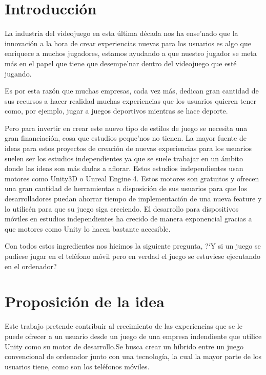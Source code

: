 \section{Introducci\'on}
\label{cap1:sec:introduccion}

La industria del videojuego en esta \'ultima d\'ecada nos ha ense'nado que la innovaci\'on
 a la hora de crear experiencias nuevas para los usuarios es algo que enriquece a muchos jugadores, estamos ayudando a que
 nuestro jugador se meta m\'as en el papel que tiene que desempe'nar dentro del
 videojuego que est\'e jugando.

Es por esta raz\'on que muchas empresas, cada vez m\'as, dedican gran cantidad de sus recursos
a hacer realidad muchas experiencias que los usuarios quieren tener como, por ejemplo,
 jugar a juegos deportivos mientras se hace deporte.

Pero para invertir en crear este nuevo tipo de estilos de juego se necesita una gran financiaci\'on,
 cosa que estudios peque'nos no tienen. La mayor fuente de ideas para estos proyectos de creaci\'on
 de nuevas experiencias para los usuarios suelen ser los estudios independientes ya que se suele trabajar en un
 \'ambito donde las ideas son m\'as dadas a aflorar. Estos estudios independientes usan motores como Unity3D o Unreal Engine 4.
 Estos motores son gratuitos y ofrecen una gran cantidad de herramientas a disposici\'on de sus usuarios para
 que los desarrolladores puedan ahorrar tiempo de implementaci\'on de una nueva feature y lo utilic\'en para que su juego siga creciendo.
El desarrollo para dispositivos m\'oviles en estudios independientes ha crecido de manera exponencial gracias a que motores como Unity lo hacen bastante accesible. 


Con todos estos ingredientes nos hicimos la siguiente pregunta,
 ?`Y si un juego se pudiese jugar en el tel\'efono m\'ovil pero en verdad el juego se estuviese ejecutando en el ordenador?


\section{Proposici\'on de la idea}
\label{cap1:sec:porp-idea}

Este trabajo pretende contribuir al crecimiento de las experiencias que se le puede ofrecer a un usuario desde un juego de una empresa indendiente que utilice Unity como su motor de desarrollo.Se busca crear un h\'ibrido entre un juego convencional de ordenador junto con una tecnolog\'ia, la cual la mayor parte de los usuarios tiene, como son los tel\'efonos m\'oviles.

